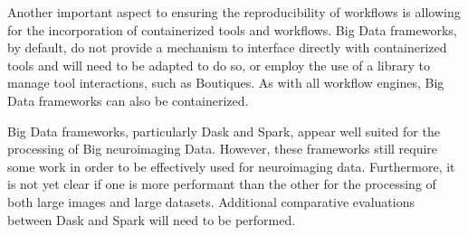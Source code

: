         Another important aspect to ensuring the reproducibility of workflows is
        allowing for the incorporation of containerized tools and workflows. Big
        Data frameworks, by default, do not provide a mechanism to interface
        directly with containerized tools and will need to be adapted to do so,
        or employ the use of a library to manage tool interactions, such as
        Boutiques. As with all workflow engines, Big Data frameworks can also be
        containerized.

        Big Data frameworks, particularly Dask and Spark, appear well suited for
        the processing of Big neuroimaging Data. However, these frameworks still
        require some work in order to be effectively used for neuroimaging data.
        Furthermore, it is not yet clear if one is more performant than the
        other for the processing of both large images and large datasets.
        Additional comparative evaluations between Dask and Spark will need to
        be performed.

